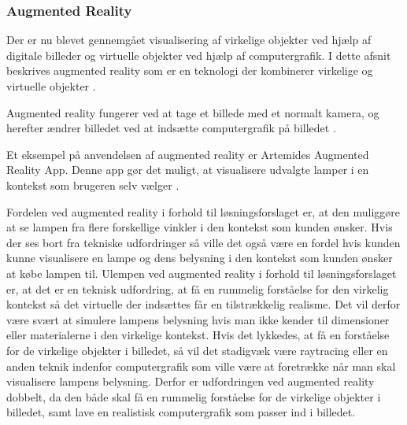 \subsubsection{Augmented Reality}
Der er nu blevet gennemgået visualisering af virkelige objekter ved hjælp af digitale billeder og virtuelle objekter ved hjælp af computergrafik. I dette afsnit beskrives augmented reality som er en teknologi der kombinerer virkelige og virtuelle objekter \cite{augmented_reality}.

Augmented reality fungerer ved at tage et billede med et normalt kamera, og herefter ændrer billedet ved at indsætte computergrafik på billedet \cite{augmented_reality}.

Et eksempel på anvendelsen af augmented reality er Artemides Augmented Reality App. Denne app gør det muligt, at visualisere udvalgte lamper i en kontekst som brugeren selv vælger \cite{artemides}. 

Fordelen ved augmented reality i forhold til løsningsforslaget er, at den muliggøre at se lampen fra flere forskellige vinkler i den kontekst som kunden ønsker. Hvis der ses bort fra tekniske udfordringer så ville det også være en fordel hvis kunden kunne visualisere en lampe og dens belysning i den kontekst som kunden ønsker at købe lampen til. \newline Ulempen ved augmented reality i forhold til løsningsforslaget er, at det er en teknisk udfordring, at få en rummelig forståelse for den virkelig kontekst så det virtuelle der indsættes får en tilstrækkelig realisme. Det vil derfor være svært at simulere lampens belysning hvis man ikke kender til dimensioner eller materialerne i den virkelige kontekst. Hvis det lykkedes, at få en forståelse for de virkelige objekter i billedet, så vil det stadigvæk være raytracing eller en anden teknik indenfor computergrafik som ville være at foretrække når man skal visualisere lampens belysning. Derfor er udfordringen ved augmented reality dobbelt, da den både skal få en rummelig forståelse for de virkelige objekter i billedet, samt lave en realistisk computergrafik som passer ind i billedet.

